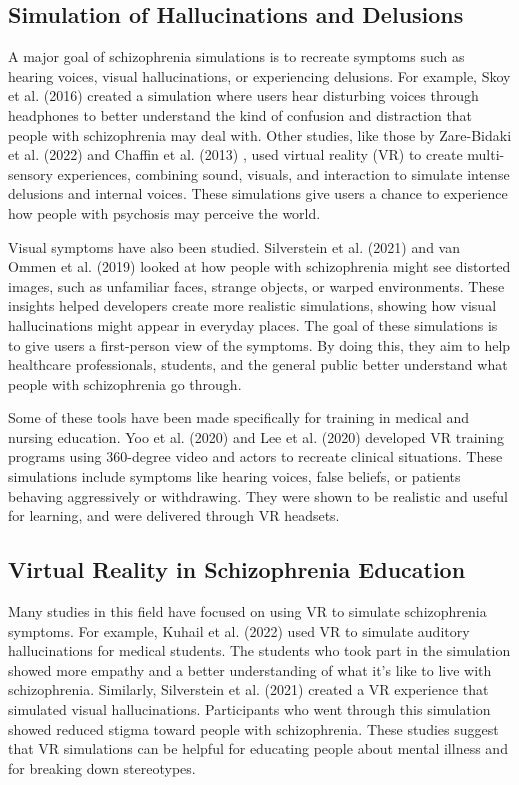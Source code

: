 \subsection{Simulation of Hallucinations and Delusions}
A major goal of schizophrenia simulations is to recreate symptoms such as hearing voices, visual hallucinations, or experiencing delusions. For example, Skoy et al. (2016) \cite{Skoy2016} created a simulation where users hear disturbing voices through headphones to better understand the kind of confusion and distraction that people with schizophrenia may deal with. Other studies, like those by Zare-Bidaki et al. (2022) \cite{Zare-Bidaki2022} and Chaffin et al. (2013) \cite{Chaffin2013}, used virtual reality (VR) to create multi-sensory experiences, combining sound, visuals, and interaction to simulate intense delusions and internal voices. These simulations give users a chance to experience how people with psychosis may perceive the world.

Visual symptoms have also been studied. Silverstein et al. (2021) \cite{Silverstein2021} and van Ommen et al. (2019) \cite{Vanommen2019} looked at how people with schizophrenia might see distorted images, such as unfamiliar faces, strange objects, or warped environments. These insights helped developers create more realistic simulations, showing how visual hallucinations might appear in everyday places. The goal of these simulations is to give users a first-person view of the symptoms. By doing this, they aim to help healthcare professionals, students, and the general public better understand what people with schizophrenia go through.

Some of these tools have been made specifically for training in medical and nursing education. Yoo et al. (2020) \cite{Yoo2020} and Lee et al. (2020) \cite{Lee2020} developed VR training programs using 360-degree video and actors to recreate clinical situations. These simulations include symptoms like hearing voices, false beliefs, or patients behaving aggressively or withdrawing. They were shown to be realistic and useful for learning, and were delivered through VR headsets.

\subsection{Virtual Reality in Schizophrenia Education}

Many studies in this field have focused on using VR to simulate schizophrenia symptoms. For example, Kuhail et al. (2022) \cite{Kuhail2022} used VR to simulate auditory hallucinations for medical students. The students who took part in the simulation showed more empathy and a better understanding of what it’s like to live with schizophrenia. Similarly, Silverstein et al. (2021) \cite{Silverstein2021} created a VR experience that simulated visual hallucinations. Participants who went through this simulation showed reduced stigma toward people with schizophrenia. These studies suggest that VR simulations can be helpful for educating people about mental illness and for breaking down stereotypes.


